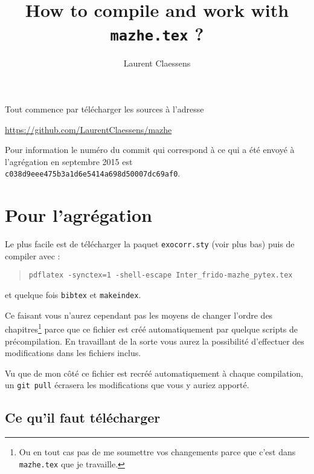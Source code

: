 \documentclass[a4paper,12pt]{article}
\newcommand{\info}[1]{\texttt{#1}}
\begin{document}
\title{How to compile and work with \info{mazhe.tex} ?}
\author{Laurent Claessens}
\maketitle

\tableofcontents


Tout commence par télécharger les sources à l'adresse
\begin{center}
    \url{https://github.com/LaurentClaessens/mazhe}
\end{center}

Pour information le numéro du commit qui correspond à ce qui a été envoyé à l'agrégation en septembre 2015 est \info{c038d9eee475b3a1d6e5414a698d50007dc69af0}.

\section{Pour l'agrégation}

Le plus facile est de télécharger la paquet \info{exocorr.sty} (voir plus bas) puis de compiler avec :
\begin{quote}
    \info{pdflatex -synctex=1 -shell-escape Inter_frido-mazhe_pytex.tex  }
\end{quote}
et quelque fois \info{bibtex} et \info{makeindex}.

Ce faisant vous n'aurez cependant pas les moyens de changer l'ordre des chapitres\footnote{Ou en tout cas pas de me soumettre vos changements parce que c'est dans \info{mazhe.tex} que je travaille.} parce que ce fichier est créé automatiquement par quelque scripts de précompilation. En travaillant de la sorte vous aurez la possibilité d'effectuer des modifications dans les fichiers inclus.

Vu que de mon côté ce fichier est recréé automatiquement à chaque compilation, un \info{git pull} écrasera les modifications que vous y auriez apporté.

\subsection{Ce qu'il faut télécharger}
\end{document}
